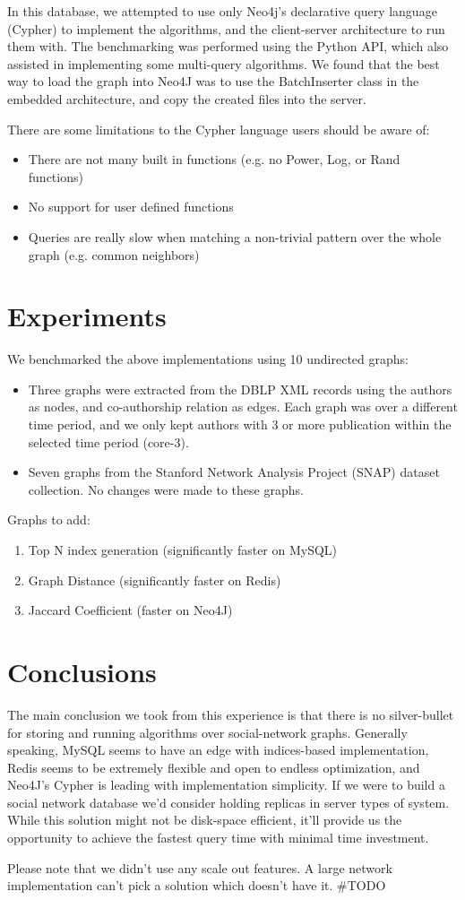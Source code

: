 In this database, we attempted to use only Neo4j's declarative query language
(Cypher) to implement the algorithms, and the client-server architecture to run
them with. The benchmarking was performed using the Python API, which also
assisted in implementing some multi-query algorithms. We found that the best
way to load the graph into Neo4J was to use the BatchInserter class in the
embedded architecture, and copy the created files into the server. 

There are some limitations to the Cypher language users should be aware of:
\begin{itemize}
\item There are not many built in functions (e.g. no Power, Log, or Rand
  functions) 
\item No support for user defined functions
\item Queries are really slow when matching a non-trivial pattern over the whole
graph (e.g. common neighbors)  
\end{itemize}

\section{Experiments}
We benchmarked the above implementations using 10 undirected graphs:
\begin{itemize}
\item Three graphs were extracted from the DBLP XML records using the authors as
nodes, and co-authorship relation as edges. Each graph was over a different
time period, and  we only kept authors with 3 or more publication within the
selected time period (core-3). 

\item Seven graphs from the Stanford Network Analysis Project (SNAP) dataset
  collection. No changes were made to these graphs.
\end{itemize}

Graphs to add:
\begin{enumerate}
\item Top N index generation (significantly faster on MySQL)
\item Graph Distance (significantly faster on Redis)
\item Jaccard Coefficient (faster on Neo4J)
\end{enumerate}

\section{Conclusions}
The main conclusion we took from this experience is that there is no silver-bullet for storing and running algorithms over social-network graphs. Generally speaking, MySQL seems to have an edge with indices-based implementation, Redis seems to be extremely flexible and open to endless optimization, and Neo4J's Cypher is leading with implementation simplicity.
If we were to build a social network database we'd consider holding replicas in server types of system. While this solution might not be disk-space efficient, it'll provide us the opportunity to achieve the fastest query time with minimal time investment.

Please note that we didn't use any scale out features. A large network implementation can't pick a solution which doesn't have it. \#TODO
